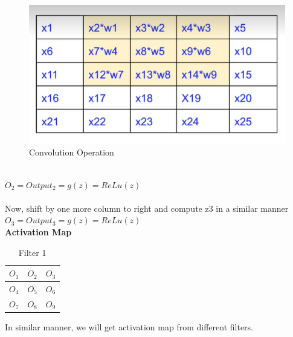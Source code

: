 \documentclass[11pt, twosides]{article}
\begin{document}
\begin{figure}[H]
\centering
\caption{Convolution Operation}
\includegraphics[scale = 0.5]{419sc2.png}
\end{figure}
\\
$O_2 = Output_2 = g(z) = ReLu(z)$\\
\\
Now, shift by one more column to right and compute z3 in a similar manner\\
$O_3 = Output_3 = g(z) = ReLu(z)$\\

\textbf{Activation Map}
\\

\begin{table}[!hbt]
	\begin{center}
	\caption{Filter 1\\}
	\begin{tabular}{|c|c|c|}
		\hline
        $O_1$ & $O_2$ & $O_3$\\
		\hline
        $O_4$ & $O_5$ & $O_6$\\
		\hline
        $O_7$ & $O_8$ & $O_9$\\
		\hline
	\end{tabular}
	\end{center}
\end{table}
In similar manner, we will get activation map from different filters.\\
\end{document}
